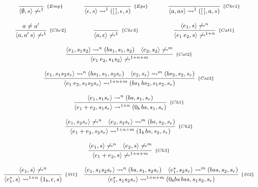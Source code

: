 \documentclass[review]{elsarticle}
\theoremstyle{definition}
\begin{document}
\begin{figure}
  \[
    \begin{array}{ccc}
        \infer[_{\{Emp\}}]{\langle \emptyset, s \rangle \not \leadsto^1}{} &
        \infer[_{\{Eps\}}]{\langle \epsilon, s\rangle \leadsto^1 ([\,],\epsilon,s)}{} &
        \infer[_{\{Chr1\}}]{\langle a, as\rangle\leadsto^1 ([\,],a,s)}{} \\ \\
        \infer[_{\{Chr2\}}]{\langle a, a'\,s \rangle \not\leadsto^1}{a \neq a'} &
        \infer[_{\{Chr3\}}]{\langle a, \epsilon \rangle\not\leadsto^1}{} &
        \infer[_{\{Cat1\}}]{\langle e_1\:e_2,s \rangle \not\leadsto^{1 + n}}
                           {\langle e_1,s \rangle\not\leadsto^n} \\ \\
      \multicolumn{3}{c}{
           \infer[_{\{Cat2\}}]{\langle e_1\:e_2,s_1s_2 \rangle \not\leadsto^{1 +
      n + m}}
                              {
                    \langle e_1, s_1s_2 \rangle \leadsto^n (bs_1, s_1, s_2) &
                    \langle e_2, s_2 \rangle \not\leadsto^m}
       }\\ \\
        \multicolumn{3}{c}{
            \infer[_{\{Cat3\}}]
                {\langle e_1\:e_2,s_1s_2s_r \rangle \leadsto^{1 + n + m}(bs_1\,bs_2,s_1s_2, s_r)}                                                              
                {\langle e_1, s_1s_2s_r \rangle \leadsto^n (bs_1,s_1,s_2s_r) &
                 \langle e_2, s_r \rangle \leadsto^m (bs_2, s_2, s_r)}
        } \\ \\
      \multicolumn{3}{c}{
          \infer[_{\{Ch1\}}]
                {\langle e_1+e_2,s_1s_r \rangle\leadsto^{1 + n} (0_b\,bs,s_1,s_r)}
                {\langle e_1, s_1s_r \rangle\leadsto^n (bs,s_1,s_r)}
      } \\ \\
      \multicolumn{3}{c}{
          \infer[_{\{Ch2\}}]
                {\langle e_1+e_2,s_2s_r \rangle\leadsto^{1 + n + m} (1_b\,bs,s_2,s_r)}
                {\langle e_1, s_2s_r \rangle\not\leadsto^n &
                 \langle e_2, s_2s_r \rangle\leadsto^m (bs,s_2,s_r)}
      } \\ \\
      \multicolumn{3}{c}{
          \infer[_{\{Ch3\}}]
                {\langle e_1+e_2,s \rangle\not\leadsto^{1 + n + m}}
                {\langle e_1, s \rangle\not\leadsto^n &
                 \langle e_2, s \rangle\not\leadsto^m }
      } \\ \\
      \infer[_{\{St1\}}]
      {\langle e_1^{\star},s \rangle\leadsto^{1 + n}(1_b,\epsilon,s)}
      {\langle e_1, s \rangle\not\leadsto^n} &
      \multicolumn{2}{c}{
          \infer[_{\{St2\}}]
                {\langle e_1^{\star},s_1s_2s_r \rangle\leadsto^{1 + n + m}(0_bbs\,bss,s_1s_2,s_r)}
                {\langle e_1, s_1s_2s_r \rangle\leadsto^n(bs,s_1,s_2s_r) &
                \langle e_1^{\star}, s_2s_r \rangle\leadsto^m(bss,s_2,s_r) }
      } \\ \\
      

\end{array}\]
\end{figure}
\end{document}
